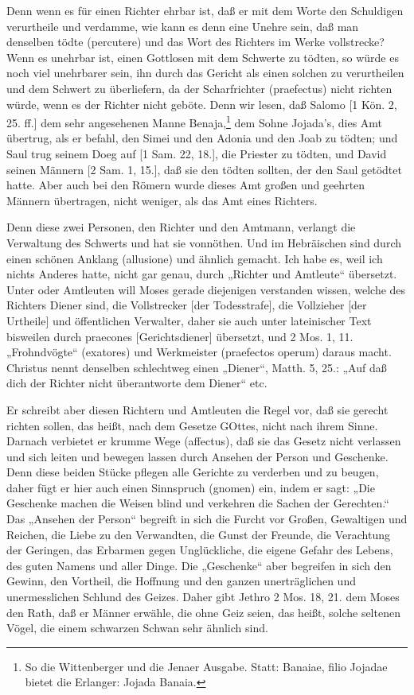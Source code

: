Denn wenn es für einen Richter ehrbar ist, daß er mit dem Worte den Schuldigen verurtheile und verdamme, wie kann es denn eine Unehre sein, daß man denselben tödte (percutere) und das Wort des Richters im Werke vollstrecke? Wenn es unehrbar ist, einen Gottlosen mit dem Schwerte zu tödten, so würde es noch viel unehrbarer sein, ihn durch das Gericht als einen solchen zu verurtheilen und dem Schwert zu überliefern, da der Scharfrichter (praefectus) nicht richten würde, wenn es der Richter nicht geböte. Denn wir lesen, daß Salomo [1 Kön. 2, 25. ff.] dem sehr angesehenen Manne Benaja,\footnote{So die Wittenberger und die Jenaer Ausgabe. Statt: Banaiae, filio Jojadae bietet die Erlanger: Jojada Banaia.} dem Sohne Jojada’s, dies Amt übertrug, als er befahl, den Simei und den Adonia und den Joab zu tödten; und Saul trug seinem Doeg auf [1 Sam. 22, 18.], die Priester zu tödten, und David seinen Männern [2 Sam. 1, 15.], daß sie den tödten sollten, der den Saul getödtet hatte. Aber auch bei den Römern wurde dieses Amt großen und geehrten Männern übertragen, nicht weniger, als das Amt eines Richters.

Denn diese zwei Personen, den Richter und den Amtmann, verlangt die Verwaltung des Schwerts und hat sie vonnöthen. Und im Hebräischen sind durch einen schönen Anklang (allusione)  und  ähnlich gemacht. Ich habe es, weil ich nichts Anderes hatte, nicht gar genau, durch „Richter und Amtleute“ übersetzt. Unter  oder Amtleuten will Moses gerade diejenigen verstanden wissen, welche des Richters Diener sind, die Vollstrecker [der Todesstrafe], die Vollzieher [der Urtheile] und öffentlichen Verwalter, daher sie auch unter lateinischer Text bisweilen durch praecones [Gerichtsdiener] übersetzt, und 2 Mos. 1, 11. „Frohndvögte“ (exatores) und Werkmeister (praefectos operum) daraus macht. Christus nennt denselben schlechtweg
einen „Diener“, Matth. 5, 25.: „Auf daß dich der Richter nicht überantworte dem Diener“ etc.

Er schreibt aber diesen Richtern und Amtleuten die Regel vor, daß sie gerecht richten sollen, das heißt, nach dem Gesetze GOttes, nicht nach ihrem Sinne. Darnach verbietet er krumme Wege (affectus), daß sie das Gesetz nicht verlassen und sich leiten und bewegen lassen durch Ansehen der Person und Geschenke. Denn diese beiden Stücke pflegen alle Gerichte zu verderben und zu beugen, daher fügt er hier auch einen Sinnspruch (gnomen) ein, indem er sagt: „Die Geschenke machen die Weisen blind und verkehren die Sachen der Gerechten.“ Das „Ansehen der Person“ begreift in sich die Furcht vor Großen, Gewaltigen und Reichen, die Liebe zu den Verwandten, die Gunst der Freunde, die Verachtung der Geringen, das Erbarmen gegen Unglückliche, die eigene Gefahr des Lebens, des guten Namens und aller Dinge. Die „Geschenke“ aber begreifen in sich den Gewinn, den Vortheil, die Hoffnung und den ganzen unerträglichen und unermesslichen Schlund des Geizes. Daher gibt Jethro 2 Mos. 18, 21. dem Moses den Rath, daß er Männer erwähle, die ohne Geiz seien, das heißt, solche seltenen Vögel, die einem schwarzen Schwan sehr ähnlich sind.


